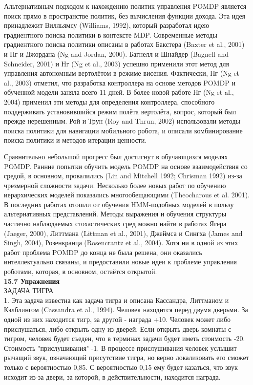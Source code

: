 \documentclass[10pt,a4paper]{article}
\begin{document}
Альтернативным подходом к нахождению политик управления POMDP является поиск прямо в пространстве политик, без вычисления функции дохода. Эта идея принадлежит Вилльямсу (Williams, 1992), который разработал идею градиентного поиска политики в контексте MDP. Современные методы градиентного поиска политики описаны в работах Бакстера (Baxter et al., 2001) и Нг и Джордана (Ng and Jordan, 2000). Багнелл и Шнайдер (Bagnell and Schneider, 2001) и Нг (Ng et al., 2003) успешно применили этот метод для управления автономным вертолётом в режиме висения. Фактически, Нг (Ng et al., 2003) отметил, что разработка контроллера на основе методов POMDP и обученной модели заняла всего 11 дней. В более новой работе Нг (Ng et al., 2004) применил эти методы для определения контроллера, способного поддерживать установившийся режим полёта вертолёта, вопрос, который был прежде нерешенным. Рой и Трун (Roy and Thrun, 2002) использовали методы поиска политики для навигации мобильного робота, и описали комбинирование поиска политики и методов итерации ценности.

Сравнительно небольшой прогресс был достигнут в обучающихся моделях POMDP. Ранние попытки обучить модель POMDP на основе взаимодействия со средой, в основном, провалились (Lin and Mitchell 1992; Chrisman 1992) из-за чрезмерной сложности задачи. Несколько более новых работ по обучению иерархических моделей показались многообещающими (Theocharous et al. 2001). В последних работах отошли от обучения HMM-подобных моделей в пользу альтернативных представлений. Методы выражения и обучения структуры частично наблюдаемых стохастических сред можно найти в работах Ягера (Jaeger, 2000), Литтмана (Littman et al., 2001), Джеймса и Сингха (James and Singh, 2004), Розенкранца (Rosencrantz et al., 2004). Хотя ни в одной из этих работ проблема POMDP до конца не была решена, они оказались интеллектуально связаны, и предоставили новые идеи к проблеме управления роботами, которая, в основном, остаётся открытой.\\

\textbf{15.7	Упражнения} \\

ЗАДАЧА ТИГРА\\

1.	Эта задача известна как задача тигра и описана Кассандра, Литтманом и Кэлблингом (Cassandra et al., 1994). Человек находится перед двумя дверьми. За одной из них находится тигр, за другой - награда +10. Человек может либо прислушаться, либо открыть одну из дверей. Если открыть дверь комнаты с тигром, человек будет съеден, что в терминах задачи будет иметь стоимость -20. Стоимость "прислушивания" -1. В процессе прислушивания человек услышит рычащий звук, означающий присутствие тигра, но верно локализовать его сможет только с вероятностью 0,85. С вероятностью 0,15 ему будет казаться, что звук исходит из-за двери, за которой, в действительности, находится награда.\\
\end{document}
